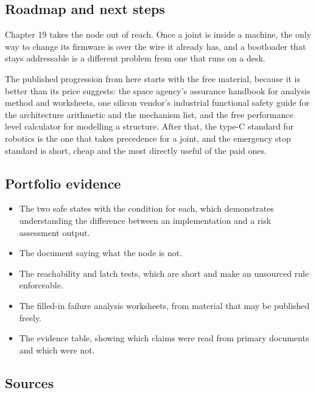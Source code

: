\subsection*{Roadmap and next steps}

Chapter 19 takes the node out of reach. Once a joint is inside a machine, the
only way to change its firmware is over the wire it already has, and a
bootloader that stays addressable is a different problem from one that runs on a
desk.

The published progression from here starts with the free material, because it is
better than its price suggests: the space agency's assurance handbook for
analysis method and worksheets, one silicon vendor's industrial functional safety
guide for the architecture arithmetic and the mechanism list, and the free
performance level calculator for modelling a structure. After that, the type-C
standard for robotics is the one that takes precedence for a joint, and the
emergency stop standard is short, cheap and the most directly useful of the paid
ones.

\subsection*{Portfolio evidence}

\begin{itemize}
\item The two safe states with the condition for each, which demonstrates
understanding the difference between an implementation and a risk assessment
output.
\item The document saying what the node is not.
\item The reachability and latch tests, which are short and make an unsourced
rule enforceable.
\item The filled-in failure analysis worksheets, from material that may be
published freely.
\item The evidence table, showing which claims were read from primary documents
and which were not.
\end{itemize}

\subsection*{Sources}

